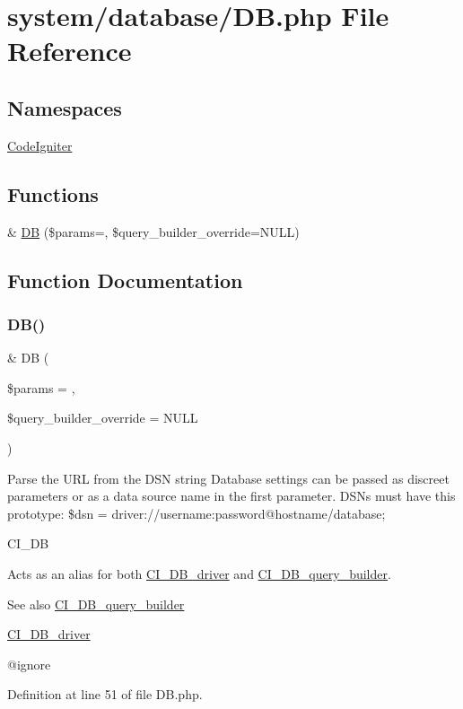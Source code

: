 \hypertarget{_d_b_8php}{}\section{system/database/\+DB.php File Reference}
\label{_d_b_8php}
\subsection*{Namespaces}
\begin{DoxyCompactItemize}
\item 
 \mbox{\hyperlink{namespace_code_igniter}{Code\+Igniter}}
\end{DoxyCompactItemize}
\subsection*{Functions}
\begin{DoxyCompactItemize}
\item 
\& \mbox{\hyperlink{_d_b_8php_a3faf383c8f1087c53bac95e803afed93}{DB}} (\$params=\textquotesingle{}\textquotesingle{}, \$query\+\_\+builder\+\_\+override=N\+U\+LL)
\end{DoxyCompactItemize}


\subsection{Function Documentation}
\mbox{\label{_d_b_8php_a3faf383c8f1087c53bac95e803afed93}} 
\subsubsection{\texorpdfstring{DB()}{DB()}}
{\footnotesize\ttfamily \& DB (\begin{DoxyParamCaption}\item[{}]{\$params = {\ttfamily \textquotesingle{}\textquotesingle{}},  }\item[{}]{\$query\+\_\+builder\+\_\+override = {\ttfamily NULL} }\end{DoxyParamCaption})}

Parse the U\+RL from the D\+SN string Database settings can be passed as discreet parameters or as a data source name in the first parameter. D\+S\+Ns must have this prototype\+: \$dsn = \textquotesingle{}driver\+://username\+:password@hostname/database\textquotesingle{};

C\+I\+\_\+\+DB

Acts as an alias for both \mbox{\hyperlink{class_c_i___d_b__driver}{C\+I\+\_\+\+D\+B\+\_\+driver}} and \mbox{\hyperlink{class_c_i___d_b__query__builder}{C\+I\+\_\+\+D\+B\+\_\+query\+\_\+builder}}.

\begin{DoxySeeAlso}{See also}
\mbox{\hyperlink{class_c_i___d_b__query__builder}{C\+I\+\_\+\+D\+B\+\_\+query\+\_\+builder}} 

\mbox{\hyperlink{class_c_i___d_b__driver}{C\+I\+\_\+\+D\+B\+\_\+driver}}
\end{DoxySeeAlso}
@ignore

Definition at line 51 of file D\+B.\+php.

